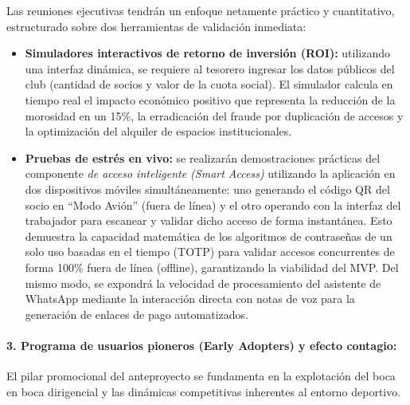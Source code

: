 Las reuniones ejecutivas tendrán un enfoque netamente práctico y cuantitativo, estructurado sobre dos herramientas de validación inmediata:
\begin{itemize}
    \item \textbf{Simuladores interactivos de retorno de inversión (ROI):} utilizando una interfaz dinámica, se requiere al tesorero ingresar los datos públicos del club (cantidad de socios y valor de la cuota social). El simulador calcula en tiempo real el impacto económico positivo que representa la reducción de la morosidad en un 15\%, la erradicación del fraude por duplicación de accesos y la optimización del alquiler de espacios institucionales.
    \item \textbf{Pruebas de estrés en vivo:} se realizarán demostraciones prácticas del componente \textit{de acceso inteligente (Smart Access)} utilizando la aplicación en dos dispositivos móviles simultáneamente: uno generando el código QR del socio en ``Modo Avión'' (fuera de línea) y el otro operando con la interfaz del trabajador para escanear y validar dicho acceso de forma instantánea. Esto demuestra la capacidad matemática de los algoritmos de contraseñas de un solo uso basadas en el tiempo (TOTP) para validar accesos concurrentes de forma 100\% fuera de línea (offline), garantizando la viabilidad del MVP. Del mismo modo, se expondrá la velocidad de procesamiento del asistente de WhatsApp mediante la interacción directa con notas de voz para la generación de enlaces de pago automatizados.
\end{itemize}

\newpage

\paragraph{3. Programa de usuarios pioneros (Early Adopters) y efecto contagio:} El pilar promocional del anteproyecto se fundamenta en la explotación del boca en boca dirigencial y las dinámicas competitivas inherentes al entorno deportivo.

